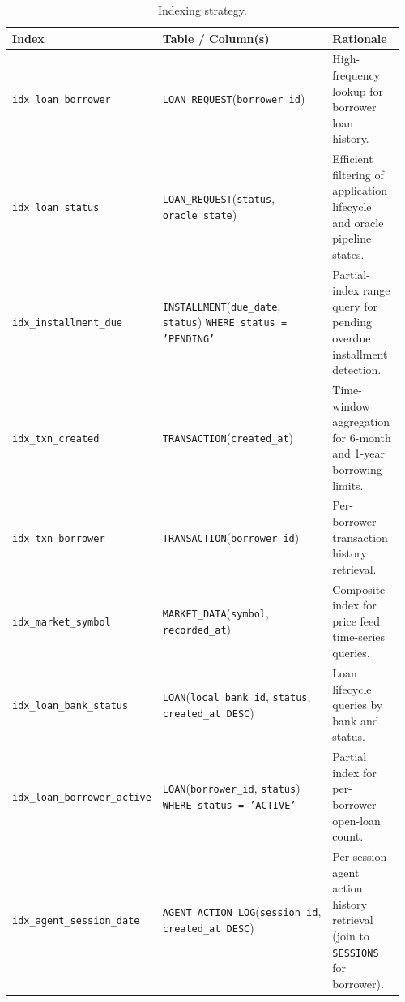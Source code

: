 \documentclass[12pt,a4paper]{report}
\newcommand{\tableheadcolor}{\rowcolor{TableHeadBg}}
\begin{document}
\begin{table}[H]
\centering
\caption[Indexing strategy]{Indexing strategy.}
\label{tab:indexing-strategy}
\begingroup
\footnotesize
\setlength{\tabcolsep}{4pt}
\renewcommand{\arraystretch}{1.2}
\begin{tabular}{@{}%
  >{\raggedright\arraybackslash}p{0.19\linewidth}%
  >{\raggedright\arraybackslash}p{0.41\linewidth}%
  >{\raggedright\arraybackslash}p{0.36\linewidth}@{}}
\toprule
\tableheadcolor
\textbf{Index} & \textbf{Table / Column(s)} & \textbf{Rationale} \\
\midrule
\texttt{idx\_loan\_borrower} &
  \texttt{LOAN\_REQUEST}(\texttt{borrower\_id}) &
  High-frequency lookup for borrower loan history. \\
\texttt{idx\_loan\_status} &
  \texttt{LOAN\_REQUEST}(\texttt{status}, \texttt{oracle\_state}) &
  Efficient filtering of application lifecycle and oracle pipeline states. \\
\texttt{idx\_installment\_due} &
  \texttt{INSTALLMENT}(\texttt{due\_date}, \texttt{status})\newline
  \texttt{WHERE status = 'PENDING'} &
  Partial-index range query for pending overdue installment detection. \\
\texttt{idx\_txn\_created} &
  \texttt{TRANSACTION}(\texttt{created\_at}) &
  Time-window aggregation for 6-month and 1-year borrowing limits. \\
\texttt{idx\_txn\_borrower} &
  \texttt{TRANSACTION}(\texttt{borrower\_id}) &
  Per-borrower transaction history retrieval. \\
\texttt{idx\_market\_symbol} &
  \texttt{MARKET\_DATA}(\texttt{symbol},\newline
  \texttt{recorded\_at}) &
  Composite index for price feed time-series queries. \\
\texttt{idx\_loan\_bank\_status} &
  \texttt{LOAN}(\texttt{local\_bank\_id}, \texttt{status},\newline
  \texttt{created\_at DESC}) &
  Loan lifecycle queries by bank and status. \\
\texttt{idx\_loan\_borrower\_active} &
  \texttt{LOAN}(\texttt{borrower\_id}, \texttt{status})\newline
  \texttt{WHERE status = 'ACTIVE'} &
  Partial index for per-borrower open-loan count. \\
\texttt{idx\_agent\_session\_date} &
  \texttt{AGENT\_ACTION\_LOG}(\texttt{session\_id},\newline
  \texttt{created\_at DESC}) &
  Per-session agent action history retrieval (join to \texttt{SESSIONS} for borrower). \\

\end{tabular}
\end{table}
\end{document}
